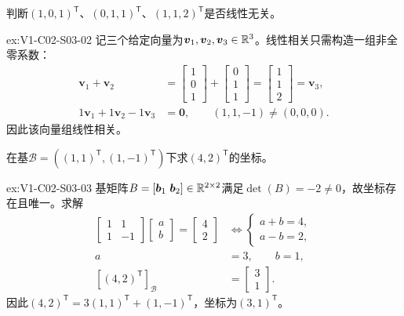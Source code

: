 \begin{SLChapterExercisePairSection}
\begin{exercise}[线性相关]\label{ex:V1-C02-S03-02}
判断$(1,0,1)^{\mathsf T}$、$(0,1,1)^{\mathsf T}$、$(1,1,2)^{\mathsf T}$是否线性无关。
\end{exercise}
\label{sol:V1-C02-S03-02}
\begin{chapterexercisesolution}{ex:V1-C02-S03-02}
记三个给定向量为$\boldsymbol v_1,\boldsymbol v_2,\boldsymbol v_3\in\mathbb{R}^3$。线性相关只需构造一组非全零系数：
\[
\begin{aligned}
\boldsymbol v_1+\boldsymbol v_2
&=\begin{bmatrix}1\\0\\1\end{bmatrix}
+\begin{bmatrix}0\\1\\1\end{bmatrix}
=\begin{bmatrix}1\\1\\2\end{bmatrix}=\boldsymbol v_3,\\
1\boldsymbol v_1+1\boldsymbol v_2-1\boldsymbol v_3
&=\boldsymbol0,
\qquad (1,1,-1)\ne(0,0,0).
\end{aligned}
\]
因此该向量组线性相关。
\end{chapterexercisesolution}

\begin{exercise}[换基坐标]\label{ex:V1-C02-S03-03}
在基$\mathcal B=((1,1)^{\mathsf T},(1,-1)^{\mathsf T})$下求$(4,2)^{\mathsf T}$的坐标。
\end{exercise}
\label{sol:V1-C02-S03-03}
\begin{chapterexercisesolution}{ex:V1-C02-S03-03}
基矩阵$B=[\boldsymbol b_1\ \boldsymbol b_2]\in\mathbb{R}^{2\times2}$满足$\det(B)=-2\ne0$，故坐标存在且唯一。求解
\[
\begin{aligned}
\begin{bmatrix}1&1\\1&-1\end{bmatrix}
\begin{bmatrix}a\\b\end{bmatrix}
=\begin{bmatrix}4\\2\end{bmatrix}
&\Longleftrightarrow
\begin{cases}a+b=4,\\a-b=2,\end{cases}\\
a&=3,\qquad b=1,\\
[(4,2)^{\mathsf T}]_{\mathcal B}
&=\begin{bmatrix}3\\1\end{bmatrix}.
\end{aligned}
\]
因此$(4,2)^{\mathsf T}=3(1,1)^{\mathsf T}+(1,-1)^{\mathsf T}$，坐标为$(3,1)^{\mathsf T}$。
\end{chapterexercisesolution}


\end{SLChapterExercisePairSection}
